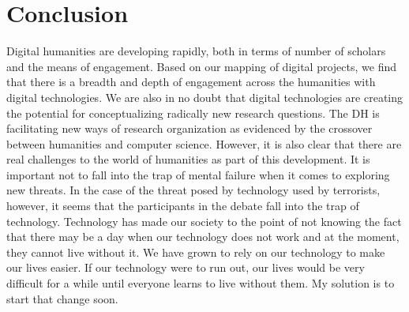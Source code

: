 \documentclass{article}
\begin{document}
\section{Conclusion}
Digital humanities are developing rapidly, both in terms of number of scholars and the means of engagement. Based on our
mapping of digital projects, we find that there is a breadth and depth of engagement across the humanities with digital
technologies. We are also in no doubt that digital technologies are creating the potential for conceptualizing radically new
research questions. The DH is facilitating new ways of research organization as evidenced by the crossover between humanities
and computer science. However, it is also clear that there are real challenges to the world of humanities as part of this
development. It is important not to fall into the trap of mental failure when it comes to exploring new threats. In the case of the
threat posed by technology used by terrorists, however, it seems that the participants in the debate fall into the trap of technology.
Technology has made our society to the point of not knowing the fact that there may be a day when our technology does not
work and at the moment, they cannot live without it. We have grown to rely on our technology to make our lives easier. If our
technology were to run out, our lives would be very difficult for a while until everyone learns to live without them. My solution
is to start that change soon.
\end{document}
